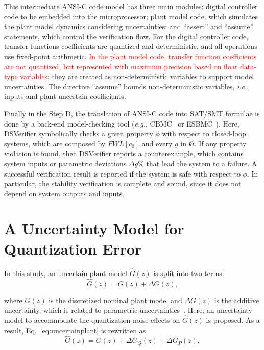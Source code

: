 \documentclass{sig-alternate-05-2015}
\begin{document}
This intermediate ANSI-C code model has three main modules: digital
controller code to be embedded into the microprocessor; plant model code,
which simulates the plant model dynamics considering uncertainties; and
``assert'' and ``assume'' statements, which control the verification flow. 
For the digital controller code, transfer functions coefficients are
quantized and deterministic, and all operations use fixed-point arithmetic. 
\textcolor{red}{In the plant model code, transfer function coefficients are
not quantized, but represented with maximum precision based on float
data-type variables}; they are treated as non-deterministic variables to
support model uncertainties.  The directive ``assume'' bounds
non-deterministic variables, {\it i.e.}, inputs and plant uncertain
coefficients.

Finally in the Step D, the translation of ANSI-C code into SAT/SMT formulae
is done by a back-end model-checking tool ({\it e.g.},
CBMC~\cite{ClarkeKL04} or ESBMC~\cite{CordeiroFM12}).  Here, DSVerifier
symbolically checks a given property $\phi$ with respect to closed-loop
systems, which are composed by $FWL[c_0]$ and every $g$ in $\mathfrak{G}$. 
If any property violation is found, then DSVerifier reports a
counterexample, which contains system inputs or parametric deviations
$\Delta{g}\%$ that lead the system to a failure.  A successful verification
result is reported if the system is safe with respect to $\phi$.  In
particular, the stability verification is complete and sound, since it does
not depend on system outputs and inputs.

\section{A Uncertainty Model for Quantization Error} 
\label{sec:uncertainty-model-quantization-error}

In this study, an uncertain plant model $\hat{G}(z)$ is split into two terms:
%
\begin{equation}
\label{eq:uncertainplant}
\hat{G}(z)=G(z)+\Delta{G(z)},
\end{equation}

\noindent where $G(z)$ is the discretized nominal plant model and
$\Delta{G(z)}$ is the additive uncertainty, which is related to parametric
uncertainties~\cite{Bessa16}.  Here, an uncertainty model to accommodate the
quantization noise effects on $\hat{G}(z)$ is proposed.  As a result,
Eq.~\eqref{eq:uncertainplant} is rewritten as
%
\begin{equation}
\label{eq:uncertainFWLplant}
\hat{G}(z)=G(z)+\Delta{G_{Q}(z)}+\Delta{G_{P}(z)},
\end{equation}
\end{document}
